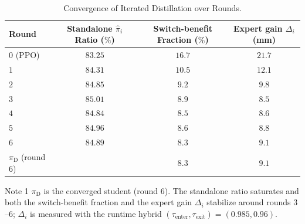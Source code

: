 \documentclass[journal, twoside]{IEEEtran}
\newcommand{\limebox}[1]{\setlength{\fboxsep}{0pt}{\colorbox{lime}{#1}}}
\newcommand{\rev}[1]{\begingroup\color{magenta}#1\endgroup}
\begin{document}
\begin{table}[!htbp]
\centering
\rev{
\caption{\rev{Convergence of Iterated Distillation over Rounds.}}
\label{tab:ablate_exit}
\begin{threeparttable}
\begin{tabular}{lccc}
\toprule
Round & \shortstack{Standalone $\hat{\pi}_{i}$\\ Ratio ($\%$)} & \shortstack{Switch-benefit\\ Fraction ($\%$)} & \shortstack{Expert gain\\ $\Delta_i$ (mm)} \\
\midrule
$0$ (PPO)          & $83.25$ & $16.7$ & $21.7$ \\
$1$                & $84.31$ & $10.5$ & $12.1$ \\
$2$                & $84.85$ & $9.2$  & $9.8$  \\
$3$                & $85.01$ & $8.9$  & $8.5$  \\
$4$                & $84.84$ & $8.5$  & $8.6$  \\
$5$                & $84.96$ & $8.6$  & $8.8$  \\
$6$                & $84.89$ & $8.3$  & $9.1$  \\
\midrule
$\pi_{\mathrm{D}}$ (round $6$) & \limebox{$84.89$} & $8.3$ & $9.1$ \\
\bottomrule
\end{tabular}
\begin{tablenotes}
    \item[Note 1] $\pi_{\mathrm{D}}$ is the converged student (round $6$). The standalone ratio saturates and both the switch-benefit fraction and the expert gain $\Delta_i$ stabilize around rounds $3$--$6$; $\Delta_i$ is measured with the runtime hybrid $(\tau_{\mathrm{enter}},\tau_{\mathrm{exit}}){=}(0.985,0.96)$.
\end{tablenotes}
\end{threeparttable}}
\end{table}
\end{document}
